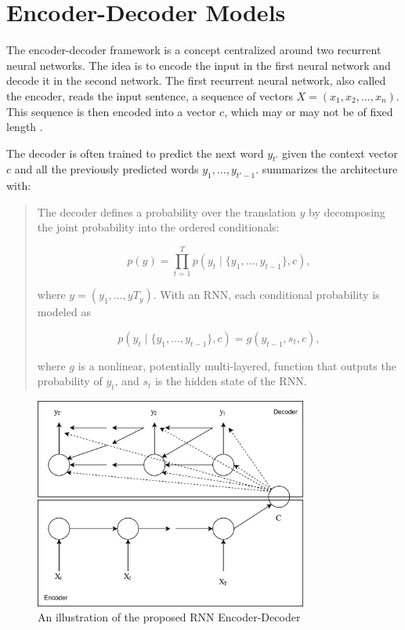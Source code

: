 
\section{Encoder-Decoder Models}
\label{sec:encoder-decoder}
The encoder-decoder framework is a concept centralized around two recurrent neural networks. The idea is to encode the input in the first neural network and decode it in the second network. The first recurrent neural network, also called the encoder, reads the input sentence, a sequence of vectors \(X = (x_{1}, x_{2}, \ldots, x_{n})\). This sequence is then encoded into a vector \(c\), which may or may not be of fixed length \citep{sutskever2014sequence, cho2014learning}. 

The decoder is often trained to predict the next word \(y_{t'}\) given the context vector \(c\) and all the previously predicted words \({y_1, \ldots, y_{t'-1}}\). \cite{bahdanau2014neural} summarizes the architecture with:

\begin{quote}
    The decoder defines a probability over the translation \(y\) by decomposing the joint probability into the ordered conditionals:
    
    \begin{equation}
        p(y)=\prod_{t=1}^{T} p(y_t \mid \{y_1, \ldots, y_{t-1}\}, c),
    \end{equation}
    
    where \(y = (y_1, \ldots, yT_y)\). With an RNN, each conditional probability is modeled as
    
    \begin{equation}
        p(y_t \mid \{y_1, \ldots, y_{t-1} \}, c) = g(y_{t-1}, s_t, c),
    \end{equation}
    
    where \(g\) is a nonlinear, potentially multi-layered, function that outputs the probability of \(y_t\), and \(s_t\) is the hidden state of the RNN.
\end{quote}

\begin{figure}[ht]
    \centering
    \includegraphics[width=0.8\textwidth]{fig/background_theory/encoder-decoder.png}
    \caption{An illustration of the proposed RNN Encoder-Decoder}
    \label{fig:purposed-encoder-decoder}
\end{figure}

